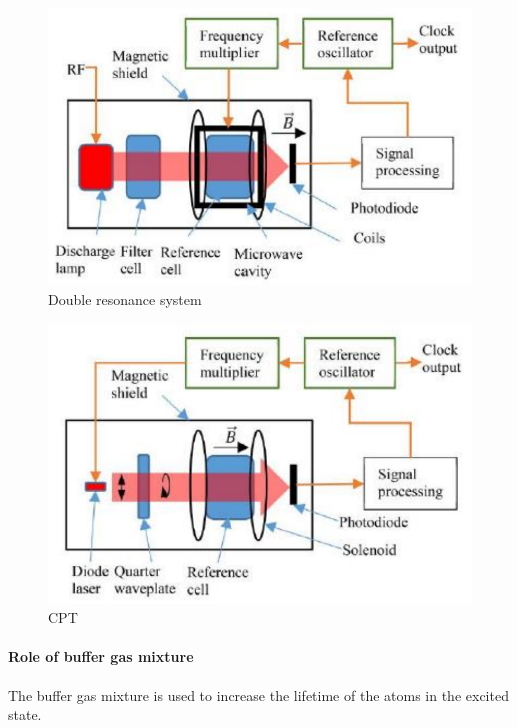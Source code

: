 \begin{figure}[H]
    \centering
    \includegraphics[width=\linewidth]{img/02.4-double-resonance-system}
    \caption{Double resonance system}
    \label{fig:double-resonance-system}
\end{figure}

\begin{figure}[H]
    \centering
    \includegraphics[width=\linewidth]{img/02.5-CPT}
    \caption{CPT}
    \label{fig:CPT}
\end{figure}


\paragraph{Role of buffer gas mixture}

The buffer gas mixture is used to increase the lifetime of the atoms in the excited state.